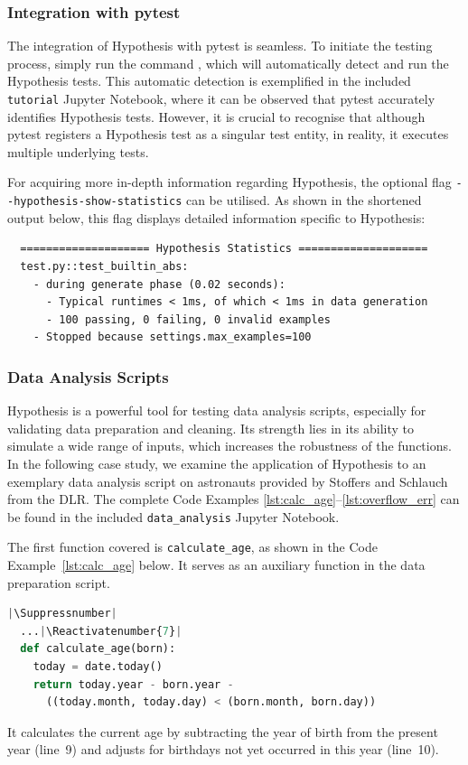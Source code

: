 \documentclass[runningheads]{llncs}
\makeatletter
\let\origthelstnumber\thelstnumber
\newcommand*\Suppressnumber{%
  \lst@AddToHook{OnNewLine}{%
    \let\thelstnumber\relax%
     \advance\c@lstnumber-\@ne\relax%
    }%
}
\newcommand*\Reactivatenumber[1]{%
  \setcounter{lstnumber}{\numexpr#1-1\relax}
  \lst@AddToHook{OnNewLine}{%
   \let\thelstnumber\origthelstnumber%
   \refstepcounter{lstnumber}%
  }%
}
\makeatother
\begin{document}
\subsubsection{Integration with pytest}
The integration of Hypothesis with pytest is seamless. To initiate the testing process, simply run the command , which will automatically detect and run the Hypothesis tests. This automatic detection is exemplified in the included \texttt{tutorial} Jupyter Notebook, where it can be observed that pytest accurately identifies Hypothesis tests. However, it is crucial to recognise that although pytest registers a Hypothesis test as a singular test entity, in reality, it executes multiple underlying tests.

\vspace{5mm}
\noindent For acquiring more in-depth information regarding Hypothesis, the optional flag \texttt{-{}-hypothesis-show-statistics} can be utilised. As shown in the shortened output below, this flag displays detailed information specific to Hypothesis:
\begin{verbatim}
  ==================== Hypothesis Statistics ====================
  test.py::test_builtin_abs:
    - during generate phase (0.02 seconds):
      - Typical runtimes < 1ms, of which < 1ms in data generation
      - 100 passing, 0 failing, 0 invalid examples
    - Stopped because settings.max_examples=100
\end{verbatim}

\subsubsection{Data Analysis Scripts}
Hypothesis is a powerful tool for testing data analysis scripts, especially for validating data preparation and cleaning. Its strength lies in its ability to simulate a wide range of inputs, which increases the robustness of the functions. In the following case study, we examine the application of Hypothesis to an exemplary data analysis script on astronauts provided by Stoffers and Schlauch~\cite{Stoffers2021} from the DLR. The complete Code Examples \ref{lst:calc_age}--\ref{lst:overflow_err} can be found in the included \texttt{data\_analysis} Jupyter Notebook.

\newpage
\noindent The first function covered is \texttt{calculate\_age}, as shown in the Code Example~\ref{lst:calc_age} below. It serves as an auxiliary function in the data preparation script.

\begin{lstlisting}[language=Python,caption={Calculate Age from \texttt{data\_analysis.ipynb}},label=lst:calc_age]
  |\Suppressnumber|
  ...|\Reactivatenumber{7}|
  def calculate_age(born):
    today = date.today()
    return today.year - born.year -
      ((today.month, today.day) < (born.month, born.day))
\end{lstlisting}
It calculates the current age by subtracting the year of birth from the present year (line~9) and adjusts for birthdays not yet occurred in this year (line~10).
\end{document}
